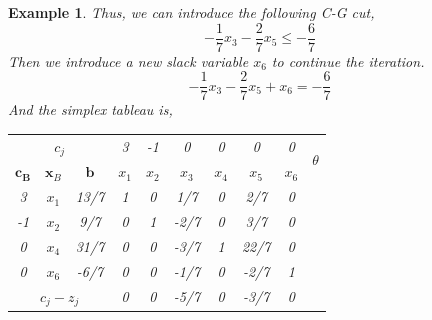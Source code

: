 \documentclass{article}
\newtheorem{example}{Example}
\begin{document}
\begin{example}
  	Thus, we can introduce the following C-G cut,
	 \begin{equation}
	 -\frac{1}{7}x_3 - \frac{2}{7}x_5 \leq -\frac{6}{7}
	 \end{equation}
	 Then we introduce a new slack variable $x_6$ to continue the iteration.
	 \begin{equation}
	 -\frac{1}{7}x_3 - \frac{2}{7}x_5 + x_6 = -\frac{6}{7}
	 \end{equation}
	 And the simplex tableau is,
		\begin{table}[htbp]
		 	\centering
		 	\begin{tabular}{@{}cccccccccc@{}}
		 		\toprule
		 		\multicolumn{3}{c}{$c_j$}      & 3       & -1    & 0    & 0    & 0      &  0 & \multirow{2}{*}{$\theta$} \\ \cmidrule(r){1-9}
		 		$\bm{c_B}$     & $\bm{x}_B$     & $\bm{b}$       & $x_1$    & $x_2$ & $x_3$ & $x_4$ & $x_5$ & $x_6$ &                        \\ \midrule
		 		3        & $x_1$     & 13/7      & 1       & 0    & 1/7    & 0    & 2/7     &   0 &                    \\
		 		-1        & $x_2$     & 9/7      & 0        & 1    & -2/7    & 0    & 3/7     &     0 &                  \\
		 		0        & $x_4$     & 31/7       & 0       & 0    & -3/7    & 1    & 22/7     &     0 &                  \\ 
		 		0   & $x_6$      &  -6/7         &   0      &  0    & -1/7    & 0    & -2/7     &   1  &  \\ \midrule
		 		\multicolumn{3}{c}{$c_j-z_j$} & 0       & 0    & -5/7    & 0    & -3/7   &  0 &                    \\  \bottomrule
		 	\end{tabular}%
	 	\end{table}
 	

\end{example}
\end{document}
